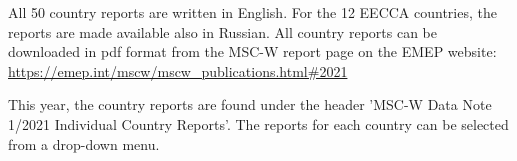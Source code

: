 
All 50 country reports are written in English. For the 12 EECCA countries, the reports are made available also in Russian. All country reports can be downloaded in pdf format from the MSC-W report page on the EMEP website:\\
\url{https://emep.int/mscw/mscw_publications.html#2021}

This year, the country reports are found under the header 'MSC-W Data Note 1/2021 Individual Country Reports'. The reports for each country can be selected from a drop-down menu.


\renewcommand\bibname{References}      %

